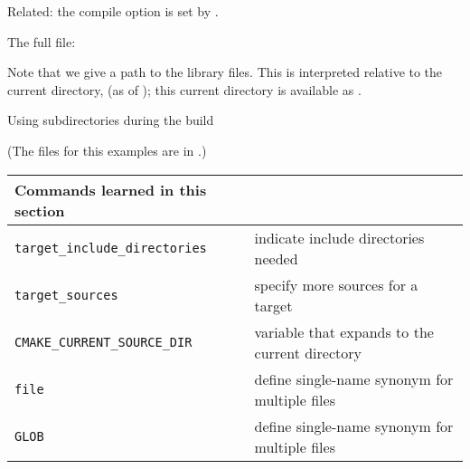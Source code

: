 Related: the  compile option
is set by .

The full  file:
%


Note that we give a path to the library files.
This is interpreted relative to the current directory,
(as of );
this current directory is available as .

\newpage
{} {Using subdirectories during the build}

(The files for this examples are in .)

\begin{tabular}{lp{3in}}
  \toprule
  Commands learned in this section\\
  \midrule
  \lstinline+target_include_directories+&indicate include directories needed\\
  \lstinline+target_sources+&specify more sources for a target\\
  \lstinline+CMAKE_CURRENT_SOURCE_DIR+&variable that expands to the current directory\\
  \lstinline+file+&define single-name synonym for multiple files\\
  \lstinline+GLOB+&define single-name synonym for multiple files\\
  \bottomrule
\end{tabular}

